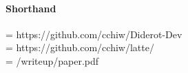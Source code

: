 \paragraph{Shorthand}
\branch{} =  https://github.com/cchiw/Diderot-Dev\\
\exs{}  = https://github.com/cchiw/latte/\\
\doc{} = \exs{}/writeup/paper.pdf\\